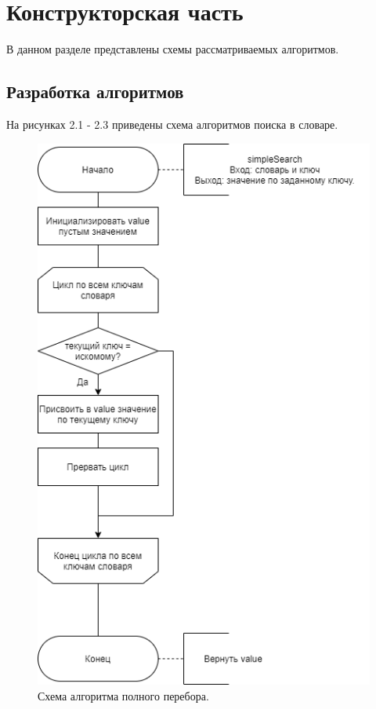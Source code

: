 \documentclass[12pt]{report}
\begin{document}
\chapter{Конструкторская часть}

В данном разделе представлены схемы рассматриваемых алгоритмов.

\section{Разработка алгоритмов}

На рисунках 2.1 - 2.3 приведены схема алгоритмов поиска в словаре.

\begin{figure}[H]
	\centering
	\includegraphics[scale=0.8]{simple_search.drawio.png}
	\caption{Схема алгоритма полного перебора.}
	\label{fig:mpr}
\end{figure}
\end{document}
